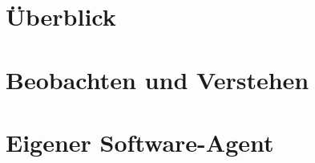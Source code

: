 \documentclass{article}
\begin{document}
  
  
  
  
  
  
  
  \section{Überblick} %
  \label{sec:uberblick}
  
  
  \section{Beobachten und Verstehen} %
  \label{sec:beobachten_und_verstehen}
  
  
  
  
  \section{Eigener Software-Agent} %
  \label{sec:eigener_software_agent}
  
  
  
\end{document}
